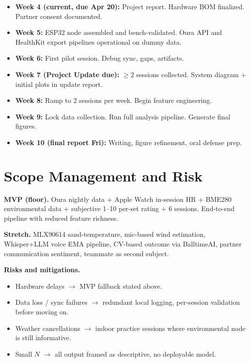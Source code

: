 \documentclass[sigconf,nonacm]{acmart}
\begin{document}
\begin{itemize}
    \item \textbf{Week 4 (current, due Apr 20):} Project report. Hardware BOM finalized. Partner consent documented.
    \item \textbf{Week 5:} ESP32 node assembled and bench-validated. Oura API and HealthKit export pipelines operational on dummy data.
    \item \textbf{Week 6:} First pilot session. Debug sync, gaps, artifacts.
    \item \textbf{Week 7 (Project Update due):} $\geq 2$ sessions collected. System diagram + initial plots in update report.
    \item \textbf{Week 8:} Ramp to 2 sessions per week. Begin feature engineering.
    \item \textbf{Week 9:} Lock data collection. Run full analysis pipeline. Generate final figures.
    \item \textbf{Week 10 (final report Fri):} Writing, figure refinement, oral defense prep.
\end{itemize}

\section{Scope Management and Risk}

\textbf{MVP (floor).} Oura nightly data + Apple Watch in-session HR + BME280 environmental data + subjective 1--10 per-set rating + 6 sessions. End-to-end pipeline with reduced feature richness.

\textbf{Stretch.} MLX90614 sand-temperature, mic-based wind estimation, Whisper+LLM voice EMA pipeline, CV-based outcome via BalltimeAI, partner communication sentiment, teammate as second subject.

\textbf{Risks and mitigations.}
\begin{itemize}
    \item Hardware delays $\to$ MVP fallback stated above.
    \item Data loss / sync failures $\to$ redundant local logging, per-session validation before moving on.
    \item Weather cancellations $\to$ indoor practice sessions where environmental node is still informative.
    \item Small $N$ $\to$ all output framed as descriptive, no deployable model.
\end{itemize}
\end{document}
